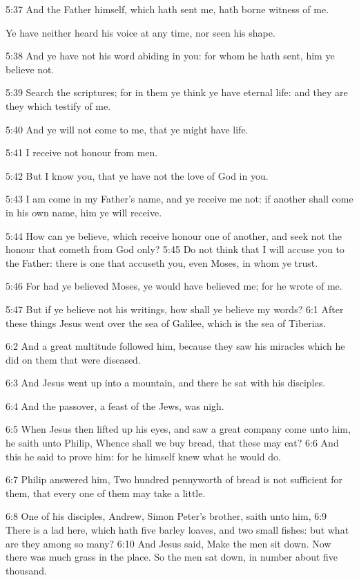5:37 And the Father himself, which hath sent me, hath borne witness of
me.

Ye have neither heard his voice at any time, nor seen his shape.

5:38 And ye have not his word abiding in you: for whom he hath sent,
him ye believe not.

5:39 Search the scriptures; for in them ye think ye have eternal life:
and they are they which testify of me.

5:40 And ye will not come to me, that ye might have life.

5:41 I receive not honour from men.

5:42 But I know you, that ye have not the love of God in you.

5:43 I am come in my Father's name, and ye receive me not: if another
shall come in his own name, him ye will receive.

5:44 How can ye believe, which receive honour one of another, and seek
not the honour that cometh from God only?  5:45 Do not think that I
will accuse you to the Father: there is one that accuseth you, even
Moses, in whom ye trust.

5:46 For had ye believed Moses, ye would have believed me; for he
wrote of me.

5:47 But if ye believe not his writings, how shall ye believe my
words?  6:1 After these things Jesus went over the sea of Galilee,
which is the sea of Tiberias.

6:2 And a great multitude followed him, because they saw his miracles
which he did on them that were diseased.

6:3 And Jesus went up into a mountain, and there he sat with his
disciples.

6:4 And the passover, a feast of the Jews, was nigh.

6:5 When Jesus then lifted up his eyes, and saw a great company come
unto him, he saith unto Philip, Whence shall we buy bread, that these
may eat?  6:6 And this he said to prove him: for he himself knew what
he would do.

6:7 Philip answered him, Two hundred pennyworth of bread is not
sufficient for them, that every one of them may take a little.

6:8 One of his disciples, Andrew, Simon Peter's brother, saith unto
him, 6:9 There is a lad here, which hath five barley loaves, and two
small fishes: but what are they among so many?  6:10 And Jesus said,
Make the men sit down. Now there was much grass in the place. So the
men sat down, in number about five thousand.

